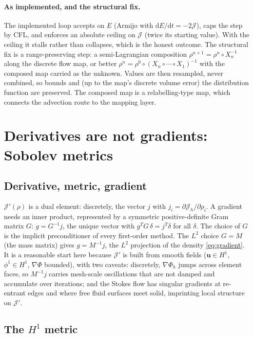 \documentclass[11pt]{article}
\newcommand{\Jf}{\mathscr{J}}  %
\newcommand{\bu}{\mathbf{u}}
\begin{document}
\paragraph{As implemented, and the structural fix.} The implemented loop
accepts on $E$ (Armijo with $\mathrm{d}E/\mathrm{d}t = -2\Jf $), caps the
step by CFL, and enforces an absolute ceiling on $\Jf $ (twice its starting
value). With the ceiling it stalls rather than collapses, which is the
honest outcome. The structural fix is a range-preserving step: a
semi-Lagrangian composition $\rho^{n+1} = \rho^{n}\circ X_n^{-1}$ along
the discrete flow map, or better $\rho^n = \rho^0\circ(X_n\circ\cdots\circ
X_1)^{-1}$ with the composed map carried as the unknown. Values are then
resampled, never combined, so bounds and (up to the map's discrete volume
error) the distribution function are preserved. The composed map is a
relabelling-type map, which connects the advection route to the mapping
layer.

\section{Derivatives are not gradients: Sobolev metrics}
\label{sec:sobolev}

\subsection{Derivative, metric, gradient}

$\Jf'(\rho)$ is a dual element: discretely, the vector $j$ with
$j_i = \partial \Jf _h/\partial\rho_i$. A gradient needs an inner product,
represented by a symmetric positive-definite Gram matrix $G$: $g =
G^{-1}j$, the unique vector with $g^{T}G\,\delta = j^{T}\delta$ for all
$\delta$. The choice of $G$ is the implicit preconditioner of every
first-order method. The $L^2$ choice $G = M$ (the mass matrix) gives
$g = M^{-1}j$, the $L^2$ projection of the density \eqref{eq:gradient}.
It is a reasonable start here because $\Jf'$ is built from smooth fields
($\bu\in H^1$, $\phi^1 \in H^1$, $\nabla\Phi$ bounded), with two caveats:
discretely, $\nabla\Phi_h$ jumps across element faces, so $M^{-1}j$
carries mesh-scale oscillations that are not damped and accumulate over
iterations; and the Stokes flow has singular gradients at re-entrant
edges and where free fluid surfaces meet solid, imprinting local
structure on $\Jf'$.

\subsection{\texorpdfstring{The $H^1$ metric}{The H1 metric}}
\end{document}
